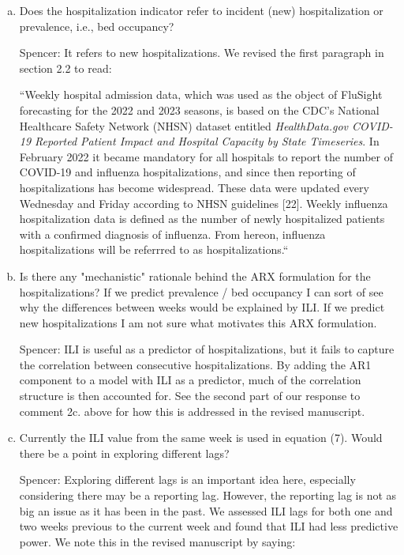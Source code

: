 \documentclass{article}
\newcommand{\spencer}[1]{{\color{blue} Spencer: #1}}
\begin{document}
\begin{enumerate}[1.]
\begin{enumerate}[a.]
\item Does the hospitalization indicator refer to incident (new) hospitalization or prevalence, i.e.,
bed occupancy?

\spencer{It refers to new hospitalizations. 
We revised the first paragraph in section 2.2 to read:

``Weekly hospital admission data, which was used as the object of FluSight 
forecasting for the 
2022 and 2023 seasons, is based on the CDC's National Healthcare Safety 
Network (NHSN) dataset entitled \textit{HealthData.gov COVID-19 Reported 
Patient Impact and Hospital Capacity by State Timeseries}. 
In February 2022 it became mandatory for 
all hospitals to report the number of COVID-19 and influenza hospitalizations, 
and since then reporting of hospitalizations has become widespread. These data 
were updated every Wednesday and Friday according to NHSN guidelines 
[22]. Weekly influenza hospitalization data is
defined as the number of newly hospitalized patients with a confirmed diagnosis 
of influenza. From hereon, influenza hospitalizations
will be referrred to as hospitalizations.``}



\item Is there any "mechanistic" rationale behind the ARX formulation for the hospitalizations? If we
predict prevalence / bed occupancy I can sort of see why the differences between weeks would be
explained by ILI. If we predict new hospitalizations I am not sure what motivates this ARX
formulation.

\spencer{ILI is useful as a predictor of hospitalizations, but it fails to 
capture the correlation between consecutive hospitalizations. By adding the 
AR1 component to a model with ILI as a predictor, much of the correlation
structure is then accounted for. 
See the second part of our response to comment 2c. above for how this is 
addressed in the revised manuscript.}

\item Currently the ILI value from the same week is used in equation (7). Would there be a point in
exploring different lags?


\spencer{Exploring different lags is an important idea here, especially considering there
may be a reporting lag. However, the reporting lag is not as big an issue as it has
been in the past. We assessed ILI lags for both one and two weeks previous to the current
week and found that ILI had less predictive power. We note this in the
revised manuscript by saying:

}
\end{enumerate}
\end{enumerate}
\end{document}
